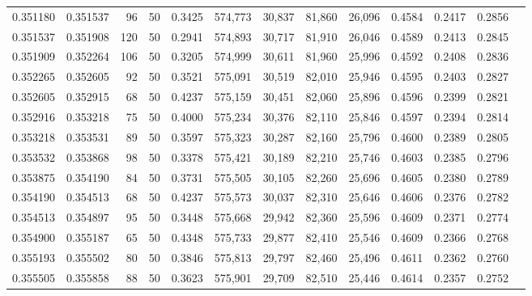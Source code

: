 \begin{tabular}{rrrrrrrrrrrrr}
0.351180 & 0.351537 &    96 &  50 &                                     0.3425 & 574,773 &  30,837 &  81,860 &  26,096 & 0.4584 & 0.2417 & 0.2856 \\
0.351537 & 0.351908 &   120 &  50 &                                     0.2941 & 574,893 &  30,717 &  81,910 &  26,046 & 0.4589 & 0.2413 & 0.2845 \\
0.351909 & 0.352264 &   106 &  50 &                                     0.3205 & 574,999 &  30,611 &  81,960 &  25,996 & 0.4592 & 0.2408 & 0.2836 \\
0.352265 & 0.352605 &    92 &  50 &                                     0.3521 & 575,091 &  30,519 &  82,010 &  25,946 & 0.4595 & 0.2403 & 0.2827 \\
0.352605 & 0.352915 &    68 &  50 &                                     0.4237 & 575,159 &  30,451 &  82,060 &  25,896 & 0.4596 & 0.2399 & 0.2821 \\
0.352916 & 0.353218 &    75 &  50 &                                     0.4000 & 575,234 &  30,376 &  82,110 &  25,846 & 0.4597 & 0.2394 & 0.2814 \\
0.353218 & 0.353531 &    89 &  50 &                                     0.3597 & 575,323 &  30,287 &  82,160 &  25,796 & 0.4600 & 0.2389 & 0.2805 \\
0.353532 & 0.353868 &    98 &  50 &                                     0.3378 & 575,421 &  30,189 &  82,210 &  25,746 & 0.4603 & 0.2385 & 0.2796 \\
0.353875 & 0.354190 &    84 &  50 &                                     0.3731 & 575,505 &  30,105 &  82,260 &  25,696 & 0.4605 & 0.2380 & 0.2789 \\
0.354190 & 0.354513 &    68 &  50 &                                     0.4237 & 575,573 &  30,037 &  82,310 &  25,646 & 0.4606 & 0.2376 & 0.2782 \\
0.354513 & 0.354897 &    95 &  50 &                                     0.3448 & 575,668 &  29,942 &  82,360 &  25,596 & 0.4609 & 0.2371 & 0.2774 \\
0.354900 & 0.355187 &    65 &  50 &                                     0.4348 & 575,733 &  29,877 &  82,410 &  25,546 & 0.4609 & 0.2366 & 0.2768 \\
0.355193 & 0.355502 &    80 &  50 &                                     0.3846 & 575,813 &  29,797 &  82,460 &  25,496 & 0.4611 & 0.2362 & 0.2760 \\
0.355505 & 0.355858 &    88 &  50 &                                     0.3623 & 575,901 &  29,709 &  82,510 &  25,446 & 0.4614 & 0.2357 & 0.2752 \\

\end{tabular}
